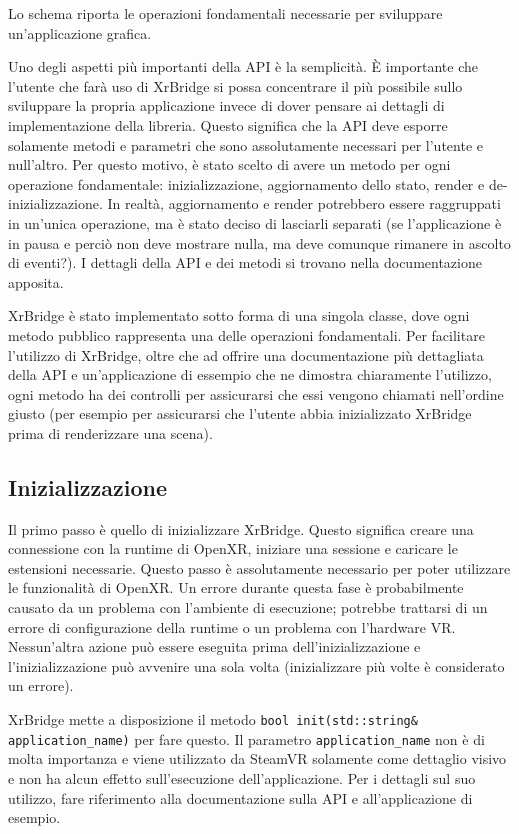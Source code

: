 \documentclass[twoside]{supsistudent}
\begin{document}
Lo schema riporta le operazioni fondamentali necessarie per sviluppare un'applicazione grafica.

Uno degli aspetti più importanti della API è la semplicità. È importante che l'utente che farà uso di XrBridge si possa concentrare il più possibile sullo sviluppare la propria applicazione invece di dover pensare ai dettagli di implementazione della libreria. Questo significa che la API deve esporre solamente metodi e parametri che sono assolutamente necessari per l'utente e null'altro. Per questo motivo, è stato scelto di avere un metodo per ogni operazione fondamentale: inizializzazione, aggiornamento dello stato, render e de-inizializzazione. In realtà, aggiornamento e render potrebbero essere raggruppati in un'unica operazione, ma è stato deciso di lasciarli separati (se l'applicazione è in pausa e perciò non deve mostrare nulla, ma deve comunque rimanere in ascolto di eventi?). I dettagli della API e dei metodi si trovano nella documentazione apposita.

XrBridge è stato implementato sotto forma di una singola classe, dove ogni metodo pubblico rappresenta una delle operazioni fondamentali. Per facilitare l'utilizzo di XrBridge, oltre che ad offrire una documentazione più dettagliata della API e un'applicazione di essempio che ne dimostra chiaramente l'utilizzo, ogni metodo ha dei controlli per assicurarsi che essi vengono chiamati nell'ordine giusto (per esempio per assicurarsi che l'utente abbia inizializzato XrBridge prima di renderizzare una scena).

\subsection{Inizializzazione}

Il primo passo è quello di inizializzare XrBridge. Questo significa creare una connessione con la runtime di OpenXR, iniziare una sessione e caricare le estensioni necessarie. Questo passo è assolutamente necessario per poter utilizzare le funzionalità di OpenXR. Un errore durante questa fase è probabilmente causato da un problema con l'ambiente di esecuzione; potrebbe trattarsi di un errore di configurazione della runtime o un problema con l'hardware VR. Nessun'altra azione può essere eseguita prima dell'inizializzazione e l'inizializzazione può avvenire una sola volta (inizializzare più volte è considerato un errore).

XrBridge mette a disposizione il metodo \texttt{bool init(std::string\& application\_name)} per fare questo. Il parametro \texttt{application\_name} non è di molta importanza e viene utilizzato da SteamVR solamente come dettaglio visivo e non ha alcun effetto sull'esecuzione dell'applicazione. Per i dettagli sul suo utilizzo, fare riferimento alla documentazione sulla API e all'applicazione di esempio.
\end{document}

